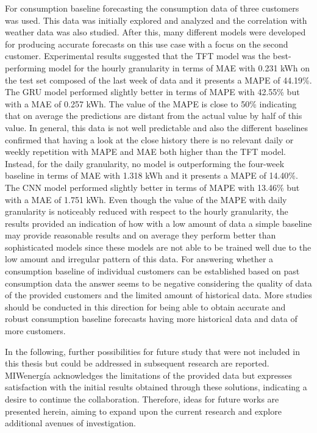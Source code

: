 For consumption baseline forecasting the consumption data of three customers was used.
This data was initially explored and analyzed and the correlation with weather data was also studied.
After this, many different models were developed for producing accurate forecasts on this use case with a focus on the second customer.
Experimental results suggested that the TFT model was the best-performing model for the hourly granularity in terms of MAE with 0.231 kWh on the test set composed of the last week of data and it presents a MAPE of 44.19\%.
The GRU model performed slightly better in terms of MAPE with 42.55\% but with a MAE of 0.257 kWh.
The value of the MAPE is close to 50\% indicating that on average the predictions are distant from the actual value by half of this value.
In general, this data is not well predictable and also the different baselines confirmed that having a look at the close history there is no relevant daily or weekly repetition with MAPE and MAE both higher than the TFT model.
Instead, for the daily granularity, no model is outperforming the four-week baseline in terms of MAE with 1.318 kWh and it presents a MAPE of 14.40\%.
The CNN model performed slightly better in terms of MAPE with 13.46\% but with a MAE of 1.751 kWh.
Even though the value of the MAPE with daily granularity is noticeably reduced with respect to the hourly granularity, the results provided an indication of how with a low amount of data a simple baseline may provide reasonable results and on average they perform better than sophisticated models since these models are not able to be trained well due to the low amount and irregular pattern of this data.
For answering whether a consumption baseline of individual customers can be established based on past consumption data the answer seems to be negative considering the quality of data of the provided customers and the limited amount of historical data.
More studies should be conducted in this direction for being able to obtain accurate and robust consumption baseline forecasts having more historical data and data of more customers.

In the following, further possibilities for future study that were not included in this thesis but could be addressed in subsequent research are reported.
MIWenergía acknowledges the limitations of the provided data but expresses satisfaction with the initial results obtained through these solutions, indicating a desire to continue the collaboration.
Therefore, ideas for future works are presented herein, aiming to expand upon the current research and explore additional avenues of investigation.

